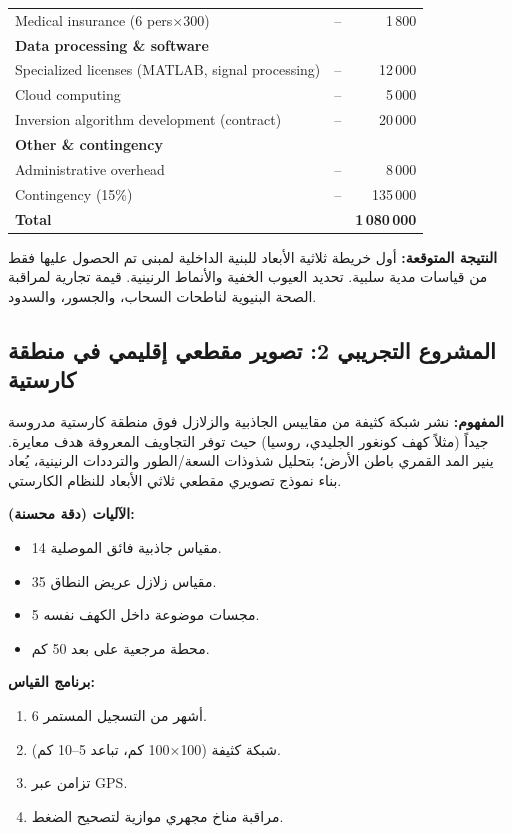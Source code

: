 \documentclass[12pt,a4paper]{article}
\theoremstyle{remark}
\begin{document}
\begin{otherlanguage}{english}
\begin{table}[htbp]
\begin{tabular}{lrr}
				Medical insurance (6 pers\(\times\)300) & – & 1\,800 \\
				\multicolumn{3}{l}{\textbf{Data processing \& software}} \\
				Specialized licenses (MATLAB, signal processing) & – & 12\,000 \\
				Cloud computing & – & 5\,000 \\
				Inversion algorithm development (contract) & – & 20\,000 \\
				\multicolumn{3}{l}{\textbf{Other \& contingency}} \\
				Administrative overhead & – & 8\,000 \\
				Contingency (15\%) & – & 135\,000 \\
				\midrule
				\textbf{Total} & & \textbf{1\,080\,000} \\
				\bottomrule
			\end{tabular}
		\end{table}
	\end{otherlanguage}
	
	\textbf{النتيجة المتوقعة:} أول خريطة ثلاثية الأبعاد للبنية الداخلية لمبنى تم الحصول عليها فقط من قياسات مدية سلبية. تحديد العيوب الخفية والأنماط الرنينية. قيمة تجارية لمراقبة الصحة البنيوية لناطحات السحاب، والجسور، والسدود.
	
	\subsection{المشروع التجريبي 2: تصوير مقطعي إقليمي في منطقة كارستية}
	
	\textbf{المفهوم:} نشر شبكة كثيفة من مقاييس الجاذبية والزلازل فوق منطقة كارستية مدروسة جيداً (مثلاً كهف كونغور الجليدي، روسيا) حيث توفر التجاويف المعروفة هدف معايرة. ينير المد القمري باطن الأرض؛ بتحليل شذوذات السعة/الطور والترددات الرنينية، يُعاد بناء نموذج تصويري مقطعي ثلاثي الأبعاد للنظام الكارستي.
	
	\textbf{الآليات (دقة محسنة):}
	\begin{itemize}
		\item 14 مقياس جاذبية فائق الموصلية.
		\item 35 مقياس زلازل عريض النطاق.
		\item 5 مجسات موضوعة داخل الكهف نفسه.
		\item محطة مرجعية على بعد 50 كم.
	\end{itemize}
	
	\textbf{برنامج القياس:}
	\begin{enumerate}
		\item 6 أشهر من التسجيل المستمر.
		\item شبكة كثيفة (100×100 كم، تباعد 5–10 كم).
		\item تزامن عبر GPS.
		\item مراقبة مناخ مجهري موازية لتصحيح الضغط.
	\end{enumerate}
	
\end{document}
